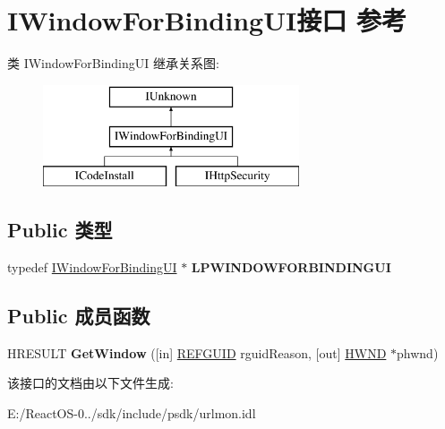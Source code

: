 \hypertarget{interface_i_window_for_binding_u_i}{}\section{I\+Window\+For\+Binding\+U\+I接口 参考}
\label{interface_i_window_for_binding_u_i}
类 I\+Window\+For\+Binding\+UI 继承关系图\+:\begin{figure}[H]
\begin{center}
\leavevmode
\includegraphics[height=3.000000cm]{interface_i_window_for_binding_u_i}
\end{center}
\end{figure}
\subsection*{Public 类型}
\begin{DoxyCompactItemize}
\item 
\mbox{\label{interface_i_window_for_binding_u_i_a7abe81b381dad990c74d90d4f6609dd3}} 
typedef \hyperlink{interface_i_window_for_binding_u_i}{I\+Window\+For\+Binding\+UI} $\ast$ {\bfseries L\+P\+W\+I\+N\+D\+O\+W\+F\+O\+R\+B\+I\+N\+D\+I\+N\+G\+UI}
\end{DoxyCompactItemize}
\subsection*{Public 成员函数}
\begin{DoxyCompactItemize}
\item 
\mbox{\label{interface_i_window_for_binding_u_i_a07c1baec01c96867d2133ce7519b49a7}} 
H\+R\+E\+S\+U\+LT {\bfseries Get\+Window} (\mbox{[}in\mbox{]} \hyperlink{struct___g_u_i_d}{R\+E\+F\+G\+U\+ID} rguid\+Reason, \mbox{[}out\mbox{]} \hyperlink{interfacevoid}{H\+W\+ND} $\ast$phwnd)
\end{DoxyCompactItemize}


该接口的文档由以下文件生成\+:\begin{DoxyCompactItemize}
\item 
E\+:/\+React\+O\+S-\/0../sdk/include/psdk/urlmon.\+idl\end{DoxyCompactItemize}
